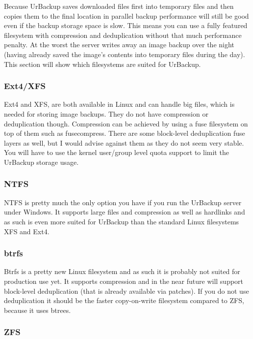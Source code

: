 \documentclass[a4paper,10pt]{article}
\begin{document}
Because UrBackup saves downloaded files first into temporary files and then copies them to the final location in parallel backup performance will still be good even if the backup storage space is slow. This means you can use a fully featured filesystem with compression and deduplication without that much performance penalty. At the worst the server writes away an image backup over the night (having already saved the image's contents into temporary files during the day). This section will show which filesystems are suited for UrBackup.

\subsubsection{Ext4/XFS}

Ext4 and XFS, are both available in Linux and can handle big files, which is needed for storing image backups. They do not have compression or deduplication though. Compression can be achieved by using a fuse filesystem on top of them such as fusecompress. There are some block-level deduplication fuse layers as well, but I would advise against them as they do not seem very stable. You will have to use the kernel user/group level quota support to limit the UrBackup storage usage.

\subsubsection{NTFS}

NTFS is pretty much the only option you have if you run the UrBackup server under Windows. It supports large files and compression as well as hardlinks and as such is even more suited for UrBackup than the standard Linux filesystems XFS and Ext4. 

\subsubsection{btrfs}

Btrfs is a pretty new Linux filesystem and as such it is probably not suited for production use yet. It supports compression and in the near future will support block-level deduplication (that is already available via patches). If you do not use deduplication it should be the faster copy-on-write filesystem compared to ZFS, because it uses btrees.

\subsubsection{ZFS}
\end{document}
